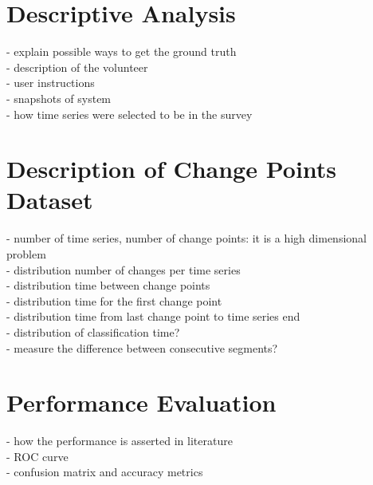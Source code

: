 \section{Descriptive Analysis}

- explain possible ways to get the ground truth\\
- description of the volunteer\\
- user instructions\\
- snapshots of system\\ 
- how time series were selected to be in the survey\\

\section{Description of Change Points Dataset}

- number of time series, number of change points: it is a high dimensional problem\\
- distribution number of changes per time series\\
- distribution time between change points\\
- distribution time for the first change point\\
- distribution time from last change point to time series end\\
- distribution of classification time?\\
- measure the difference between consecutive segments?\\

\section{Performance Evaluation}

- how the performance is asserted in literature\\
- ROC curve\\
- confusion matrix and accuracy metrics\\
